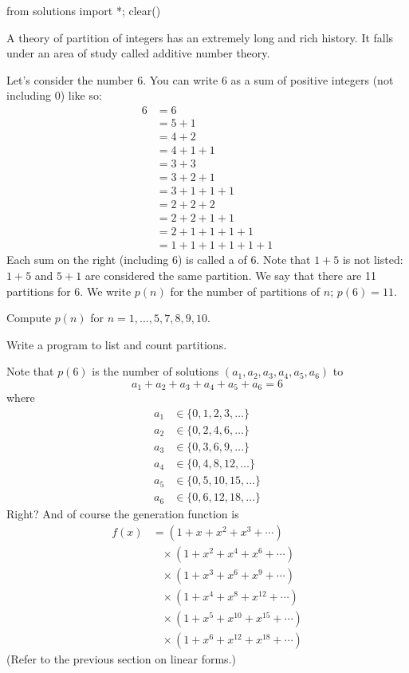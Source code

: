 \begin{python0}
from solutions import *; clear() 
\end{python0}

A theory of partition of integers has an extremely long and rich history.
It falls under an area of study called additive number theory.

Let's consider the number 6.
You can write 6 as a sum of positive integers (not including 0) like so:
\begin{align*}
6
&= 6 \\
&= 5 + 1\\
&= 4 + 2 \\
&= 4 + 1 + 1 \\
&= 3 + 3 \\
&= 3 + 2 + 1 \\
&= 3 + 1 + 1 + 1 \\
&= 2 + 2 + 2 \\
&= 2 + 2 + 1 + 1 \\
&= 2 + 1 + 1 + 1 + 1 \\
&= 1 + 1 + 1 + 1 + 1 + 1 
\end{align*}
Each sum on the right (including $6$) is called a  of $6$.
Note that $1 + 5$ is not listed: $1 + 5$ and $5 + 1$ are considered
the same partition.
We say that there are 11 partitions for $6$.
We write $p(n)$ for the number of partitions of $n$;
$p(6) = 11$.


\newpage
\begin{ex}
Compute $p(n)$ for $n = 1, ..., 5, 7, 8, 9, 10$.
\end{ex}


\newpage
\begin{ex}
Write a program to list and count partitions.
\end{ex}


\newpage
Note that $p(6)$ is the number of solutions $(a_1, a_2, a_3, a_4, a_5, a_6)$ to
\[
a_1 +  a_2 +  a_3 + a_4 + a_5 + a_6 = 6
\]
where 
\begin{align*}
a_1 &\in \{0, 1, 2, 3, \ldots\} \\
a_2 &\in \{0, 2, 4, 6, \ldots\} \\
a_3 &\in \{0, 3, 6, 9, \ldots\} \\
a_4 &\in \{0, 4, 8, 12, \ldots\} \\
a_5 &\in \{0, 5, 10, 15, \ldots\} \\
a_6 &\in \{0, 6, 12, 18, \ldots\} 
\end{align*}
Right? 
And of course the generation function is
\begin{align*}
f(x) 
&= (1 + x + x^2 + x^3 + \cdots ) \\
& \,\,\,\,\, \times (1 + x^2 + x^4 + x^6 + \cdots ) \\
& \,\,\,\,\, \times (1 + x^3 + x^6 + x^9 + \cdots ) \\
& \,\,\,\,\, \times (1 + x^4 + x^8 + x^{12} + \cdots ) \\
& \,\,\,\,\, \times (1 + x^5 + x^{10} + x^{15} + \cdots ) \\
& \,\,\,\,\, \times (1 + x^6 + x^{12} + x^{18} + \cdots ) 
\end{align*}
(Refer to the previous section on linear forms.)

